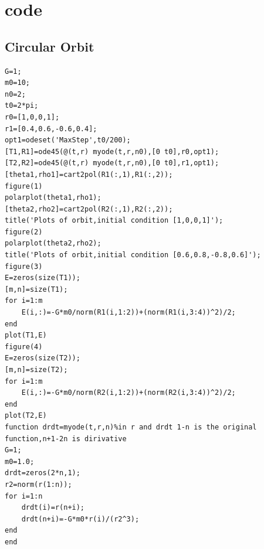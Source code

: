 \documentclass{article}
\begin{document}
\section{code}
\subsection{Circular Orbit}
\begin{lstlisting}
G=1;
m0=10;
n0=2;
t0=2*pi;
r0=[1,0,0,1];
r1=[0.4,0.6,-0.6,0.4];
opt1=odeset('MaxStep',t0/200);
[T1,R1]=ode45(@(t,r) myode(t,r,n0),[0 t0],r0,opt1);
[T2,R2]=ode45(@(t,r) myode(t,r,n0),[0 t0],r1,opt1);
[theta1,rho1]=cart2pol(R1(:,1),R1(:,2));
figure(1)
polarplot(theta1,rho1);
[theta2,rho2]=cart2pol(R2(:,1),R2(:,2));
title('Plots of orbit,initial condition [1,0,0,1]');
figure(2)
polarplot(theta2,rho2);
title('Plots of orbit,initial condition [0.6,0.8,-0.8,0.6]');
figure(3)
E=zeros(size(T1));
[m,n]=size(T1);
for i=1:m
    E(i,:)=-G*m0/norm(R1(i,1:2))+(norm(R1(i,3:4))^2)/2;
end
plot(T1,E)
figure(4)
E=zeros(size(T2));
[m,n]=size(T2);
for i=1:m
    E(i,:)=-G*m0/norm(R2(i,1:2))+(norm(R2(i,3:4))^2)/2;
end
plot(T2,E)
function drdt=myode(t,r,n)%in r and drdt 1-n is the original function,n+1-2n is dirivative
G=1;
m0=1.0;
drdt=zeros(2*n,1);
r2=norm(r(1:n));
for i=1:n
    drdt(i)=r(n+i);
    drdt(n+i)=-G*m0*r(i)/(r2^3);
end
end
\end{lstlisting}
\end{document}
